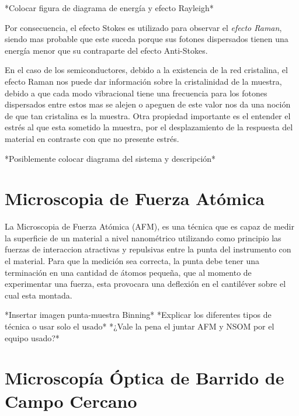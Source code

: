 *Colocar figura de diagrama de energía y efecto Rayleigh*

Por consecuencia, el efecto Stokes es utilizado para observar el \textit{efecto Raman}, siendo mas probable que
este suceda porque sus fotones dispersados tienen una energía menor que su contraparte del efecto Anti-Stokes.

En el caso de los semiconductores, debido a la existencia de la red cristalina, el efecto Raman nos puede dar información 
sobre la cristalinidad de la muestra, debido a que cada modo vibracional tiene una frecuencia para los fotones dispersados 
entre estos mas se alejen o apeguen de este valor nos da una noción de que tan cristalina es la muestra. Otra propiedad
importante es el entender el estrés al que esta sometido la muestra, por el desplazamiento de la respuesta del material 
en contraste con que no presente estrés.

*Posiblemente colocar diagrama del sistema y descripción*
\newpage

\section{Microscopia de Fuerza Atómica}
\label{sec:chap3-afm}
La Microscopia de Fuerza Atómica (AFM), es una técnica que es capaz de medir la superficie de un material a nivel 
nanométrico utilizando como principio las fuerzas de interaccion atractivas y repulsivas entre la punta del instrumento 
con el material. Para que la medición sea correcta, la punta debe tener una terminación en una cantidad de átomos 
pequeña, que al momento de experimentar una fuerza, esta provocara una deflexión en el cantiléver sobre el cual esta 
montada.\cite{Binnig1986}

*Insertar imagen punta-muestra Binning*
*Explicar los diferentes tipos de técnica o usar solo el usado*
*¿Vale la pena el juntar AFM y NSOM por el equipo usado?*
\section{Microscopía Óptica de Barrido de Campo Cercano}
\label{sec:chap3-nsom}
\newpage